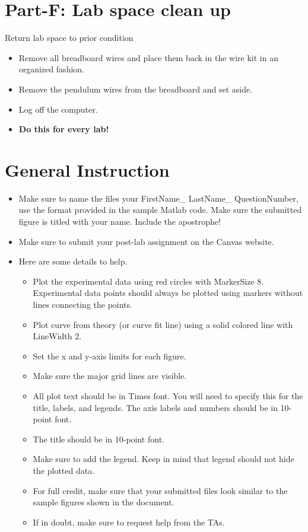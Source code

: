 \documentclass{article} %
\begin{document}
\section{Part-F: Lab space clean up}
Return lab space to prior condition
\begin{itemize}
\item Remove all breadboard wires and place them back in the wire kit in an organized fashion.
\item Remove the pendulum wires from the breadboard and set aside.
\item Log off the computer.
\item {\bf Do this for every lab!}
\end{itemize}


\section{General Instruction}
\begin{itemize}
\item Make sure to name the files your FirstName\_ LastName\_ QuestionNumber, use the format provided in the sample Matlab code. Make sure the submitted figure is titled with your name. Include the apostrophe!
\item Make sure to submit your post-lab assignment on the Canvas website.
\item Here are some details to help.
\begin{itemize}
\item Plot the experimental data using red circles with MarkerSize 8. Experimental data points should always be plotted using markers without lines connecting the points.
\item Plot curve from theory (or curve fit line) using a solid colored line with LineWidth 2.
\item  Set the x and y-axis limits for each figure.
\item Make sure the major grid lines are visible.
\item All plot text should be in Times font. You will need to specify this for the title, labels, and legends. The axis labels and numbers should be in 10-point font.
\item The title should be in 10-point font.
\item Make sure to add the legend. Keep in mind that legend should not hide the plotted data.
\item For full credit, make sure that your submitted files look similar to the sample figures shown in the document.
\item If in doubt, make sure to request help from the TAs.
\end{itemize}
\end{itemize}
\end{document}
